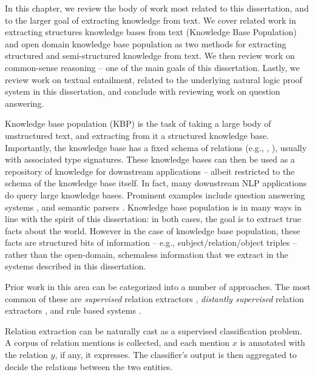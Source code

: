 In this chapter, we review the body of work most related to this dissertation, and to
  the larger goal of extracting knowledge from text.
We cover related work in extracting structures knowledge bases from text
  (Knowledge Base Population) and open domain knowledge base population
  as two methods for extracting structured and semi-structured knowledge from
  text.
We then review work on common-sense reasoning -- one of the main goals of this dissertation.
Lastly, we review work on textual entailment, related to the underlying natural logic
  proof system in this dissertation, and conclude with reviewing work on question answering.


%
%

Knowledge base population (KBP) is the task of taking a large body of unstructured text,
  and extracting from it a structured knowledge base.
Importantly, the knowledge base has a fixed schema of relations (e.g.,
  , ), usually with associated type signatures.
These knowledge bases can then be used as a repository of knowledge for
  downstream applications -- albeit restricted to the schema of the knowledge base itself.
In fact, many downstream NLP applications do query large knowledge bases.
Prominent examples include
  question answering systems
    \cite{key:2001voorhees-trec},
  and semantic parsers
    \cite{key:1996zelle-semantics,key:2007zettlemoyer-semantics,key:2013kwiatkowski-semantics,key:2014berant-semantics}.
Knowledge base population is in many ways in line with the spirit of this dissertation:
  in both cases, the goal is to extract true facts about the world.
However in the case of knowledge base population, these facts are structured bits of information -- e.g.,
  subject/relation/object triples -- rather than the open-domain, schemaless information that we 
  extract in the systems described in this dissertation.

Prior work in this area can be categorized into a number of approaches.
The most common of these are \textit{supervised} relation extractors
  \cite{key:2004doddington-ace,key:2005zhou-ace,key:2007surdeanu-ace},
  \textit{distantly supervised} relation extractors
  \cite{key:1999craven-distsup,key:2007wu-distsup,key:2009mintz-distsup,key:2011sun-kbp},
  and rule based systems
  \cite{key:1997soderland-kbp,key:2010grishman-kbp,key:2010chen-kbp}.


Relation extraction can be naturally cast as a supervised classification problem.
A corpus of relation mentions is collected,
  and each mention $x$ is annotated
  with the relation $y$, if any, it expresses. The classifier's output
  is then aggregated to decide the relations between the two entities.

